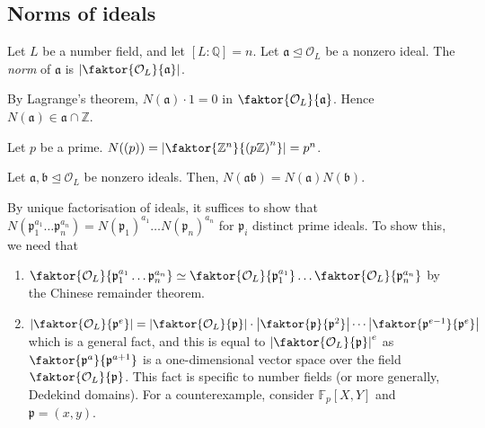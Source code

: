 \subsection{Norms of ideals}
\begin{definition}
    Let \( L \) be a number field, and let \( [L:\mathbb Q] = n \).
    Let \( \mathfrak a \trianglelefteq \mathcal O_L \) be a nonzero ideal.
    The \emph{norm} of \( \mathfrak a \) is \( \abs{\faktor{\mathcal O_L}{\mathfrak a}} \).
\end{definition}
By Lagrange's theorem, \( N(\mathfrak a) \cdot 1 = 0 \) in \( \faktor{\mathcal O_L}{\mathfrak a} \).
Hence \( N(\mathfrak a) \in \mathfrak a \cap \mathbb Z \).
\begin{example}
    Let \( p \) be a prime.
    \( N((p)) = \abs{\faktor{\mathbb Z^n}{\qty(p\mathbb Z)^n}} = p^n \).
\end{example}
\begin{proposition}
    Let \( \mathfrak a, \mathfrak b \trianglelefteq \mathcal O_L \) be nonzero ideals.
    Then, \( N(\mathfrak a \mathfrak b) = N(\mathfrak a) N(\mathfrak b) \).
\end{proposition}
\begin{remark}
    By unique factorisation of ideals, it suffices to show that \( N(\mathfrak p_1^{a_1} \dots \mathfrak p_n^{a_n}) = N(\mathfrak p_1)^{a_1} \dots N(\mathfrak p_n)^{a_n} \) for \( \mathfrak p_i \) distinct prime ideals.
    To show this, we need that
    \begin{enumerate}
        \item \( \faktor{\mathcal O_L}{\mathfrak p_1^{a_1} \dots \mathfrak p_n^{a_n}} \simeq \faktor{\mathcal O_L}{\mathfrak p_1^{a_1}} \dots \faktor{\mathcal O_L}{\mathfrak p_n^{a_n}} \) by the Chinese remainder theorem.
        \item \( \abs{\faktor{\mathcal O_L}{\mathfrak p^e}} = \abs{\faktor{\mathcal O_L}{\mathfrak p}} \cdot \abs{\faktor{\mathfrak p}{\mathfrak p^2}} \cdots \abs{\faktor{\mathfrak p^{e-1}}{\mathfrak p^e}} \) which is a general fact, and this is equal to \( \abs{\faktor{\mathcal O_L}{\mathfrak p}}^e \) as \( \faktor{\mathfrak p^a}{\mathfrak p^{a+1}} \) is a one-dimensional vector space over the field \( \faktor{\mathcal O_L}{\mathfrak p} \).
        This fact is specific to number fields (or more generally, Dedekind domains).
        For a counterexample, consider \( \mathbb F_p[X,Y] \) and \( \mathfrak p = (x,y) \).
    \end{enumerate}
\end{remark}
